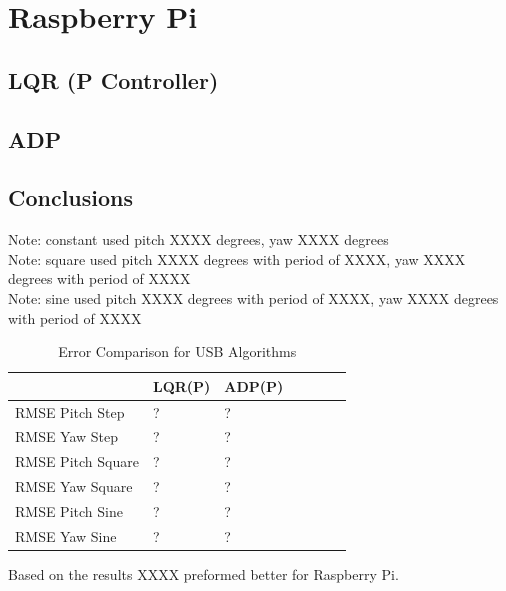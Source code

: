 \section{Raspberry Pi}

\subsection{LQR (P Controller)}

\subsection{ADP}

\subsection{Conclusions}
Note: constant used pitch XXXX degrees, yaw XXXX degrees\\
Note: square used pitch XXXX degrees with period of XXXX, yaw XXXX degrees with period of XXXX\\
Note: sine used pitch XXXX degrees with period of XXXX, yaw XXXX degrees with period of XXXX\\
\begin{table}[h!]
    \centering
    \begin{tabular}{l|l|l|l|l|l|l}
        \toprule
        \textbf{} & \textbf{LQR(P)} & \textbf{ADP(P)} \\
        \toprule
        RMSE Pitch Step & ? & ?  \\
        RMSE Yaw Step & ? & ? \\
        RMSE Pitch Square & ? & ? \\
        RMSE Yaw Square & ? & ? \\
        RMSE Pitch Sine & ? & ? \\
        RMSE Yaw Sine & ? & ? \\
        \bottomrule
    \end{tabular}
    \caption{Error Comparison for USB Algorithms}
    \label{tab:USB_RMSE}
\end{table}
Based on the results XXXX preformed better for Raspberry Pi.

